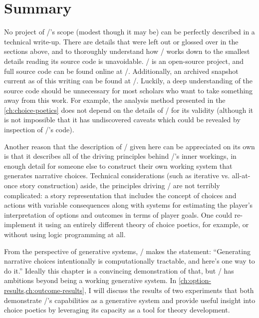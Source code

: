 \section{Summary}

No project of \dunyazad/'s scope (modest though it may be) can be perfectly described in a technical write-up.
%
There are details that were left out or glossed over in the sections above, and to thoroughly understand how \dunyazad/ works down to the smallest details reading its source code is unavoidable.
%
\dunyazad/ is an open-source project, and full source code can be found online at \githuburl/.
%
Additionally, an archived snapshot current as of this writing can be found at \archiveurl/.
%
Luckily, a deep understanding of the source code should be unnecessary for most scholars who want to take something away from this work.
%
For example, the analysis method presented in the \cref{ch:choice-poetics} does not depend on the details of \dunyazad/ for its validity (although it is not impossible that it has undiscovered caveats which could be revealed by inspection of \dunyazad/'s code).


Another reason that the description of \dunyazad/ given here can be appreciated on its own is that it describes all of the driving principles behind \dunyazad/'s inner workings, in enough detail for someone else to construct their own working system that generates narrative choices.
%
Technical considerations (such as iterative vs\@. all-at-once story construction) aside, the principles driving \dunyazad/ are not terribly complicated: a story representation that includes the concept of choices and actions with variable consequences along with systems for estimating the player's interpretation of options and outcomes in terms of player goals.
%
One could re-implement it using an entirely different theory of choice poetics, for example, or without using logic programming at all.


From the perspective of generative systems, \dunyazad/ makes the statement: ``Generating narrative choices intentionally is computationally tractable, and here's one way to do it.''
%
Ideally this chapter is a convincing demonstration of that, but \dunyazad/ has ambitions beyond being a working generative system.
%
In \cref{ch:option-results,ch:outcome-results}, I will discuss the results of two experiments that both demonstrate \dunyazad/'s capabilities as a generative system and provide useful insight into choice poetics by leveraging its capacity as a tool for theory development.

\label{sec:dunyazad-summary}%

